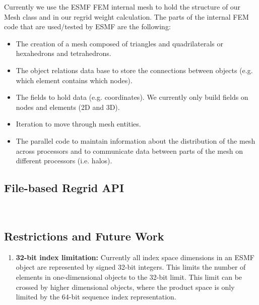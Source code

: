 Currently we use the ESMF FEM internal mesh to hold the structure of our Mesh class and 
in our regrid weight calculation. The parts of the internal FEM code that are used/tested by ESMF are the following:
\begin{itemize}
\item The creation of a mesh composed of triangles and quadrilaterals or hexahedrons and tetrahedrons.
\item The object relations data base to store the connections between objects (e.g. which element contains which nodes).
\item The fields to hold data (e.g. coordinates). We currently only build fields on nodes and elements (2D and 3D).
\item Iteration to move through mesh entities.
\item The parallel code to maintain information about the distribution of the mesh across processors and to communicate data between parts of the mesh on different processors (i.e. halos).
\end{itemize}



\subsection{File-based Regrid API}~\label{sec:filebasedregrid}



\subsection{Restrictions and Future Work}
\begin{enumerate}

\item {\bf 32-bit index limitation:} Currently all index space dimensions in an ESMF object are represented by signed 32-bit integers. This limits the number of elements in one-dimensional objects to the 32-bit limit. This limit can be crossed by higher dimensional objects, where the product space is only limited by the 64-bit sequence index representation.
\end{enumerate}
